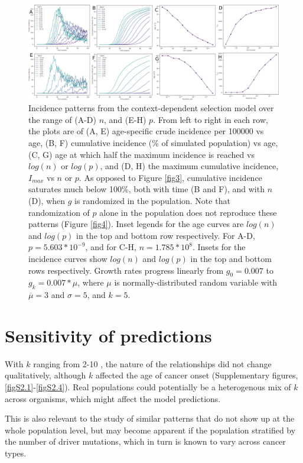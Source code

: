 \documentclass[10pt,twocolumn,twoside]{article}
\begin{document}
\begin{figure}[tbhp]
	\centering
	\includegraphics[width=\linewidth, keepaspectratio=true]{fig5.png}
	\caption{Incidence patterns from the context-dependent selection model over the range of (A-D) $n$, and (E-H) $p$. From left to right in each row, the plots are of (A, E) age-specific crude incidence per 100000 vs age, (B, F) cumulative incidence (\% of simulated population) vs age, (C, G) age at which half the maximum incidence is reached vs $log(n)$ or $log(p)$, and (D, H) the maximum cumulative incidence, $I_{max}$ vs $n$ or $p$. As opposed to Figure \ref{fig3}, cumulative incidence saturates much below 100\%, both with time (B and F), and with $n$ (D), when $g$ is randomized in the population. Note that randomization of $p$ alone in the population does not reproduce these patterns (Figure \ref{fig4}). Inset legends for the age curves are $log(n)$ and $log(p)$ in the top and bottom row respectively. For A-D, $p=5.603*10^{-9}$, and for C-H, $n=1.785*10^{8}$. Insets for the incidence curves show $log(n)$ and $log(p)$ in the top and bottom rows respectively. Growth rates progress linearly from $g_{0}=0.007$ to $g_{k}=0.007*\mu$, where $\mu$ is normally-distributed random variable with $\overline{\mu}=3$ and $\sigma=5$, and $k=5$.}
	\label{fig5}
\end{figure}


\section{Sensitivity of predictions}

With $k$ ranging from 2-10 \cite{Martincorena2017}, the nature of the relationships did not change qualitatively, although $k$ affected the age of cancer onset (Supplementary figures, \ref{figS2.1}-\ref{figS2.4}). Real populations could potentially be a heterogenous mix of $k$ across organisms, which might affect the model predictions. 

This is also relevant to the study of similar patterns that do not show up at the whole population level, but may become apparent if the population stratified by the number of driver mutations, which in turn is known to vary across cancer types.
\end{document}
